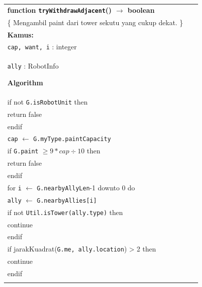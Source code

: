 \documentclass{article}
\newenvironment{pseudobox}
{
\centering
\begin{longtable}{|p{0.94\linewidth}|}
\hline
}
{
\\ \hline
\end{longtable}
\vspace{0.05cm}
}
\begin{document}
\begin{enumerate}[label=\alph*.]
\begin{enumerate}[label=\alph*.]
\begin{pseudobox}
\textbf{function \texttt{tryWithdrawAdjacent}() $\rightarrow$ boolean} \\
\{ Mengambil paint dari tower sekutu yang cukup dekat. \} \\

\textbf{Kamus:} \\
\hspace*{1.5em}\texttt{cap, want, i} : integer \\
\hspace*{1.5em}\texttt{ally} : RobotInfo

\textbf{Algorithm} \\
\hspace*{1.5em}if not \texttt{G.isRobotUnit} then \\
\hspace*{3em}return false \\
\hspace*{1.5em}endif \\

\hspace*{1.5em}\texttt{cap} $\leftarrow$ \texttt{G.myType.paintCapacity} \\
\hspace*{1.5em}if \texttt{G.paint} $\geq 9 * cap \div 10$ then \\
\hspace*{3em}return false \\
\hspace*{1.5em}endif \\

\hspace*{1.5em}for \texttt{i} $\leftarrow$ \texttt{G.nearbyAllyLen}-1 downto 0 do \\
\hspace*{3em}\texttt{ally} $\leftarrow$ \texttt{G.nearbyAllies[i]} \\

\hspace*{3em}if not \texttt{Util.isTower(ally.type)} then \\
\hspace*{4.5em}continue \\
\hspace*{3em}endif \\

\hspace*{3em}if jarakKuadrat(\texttt{G.me, ally.location}) > 2 then \\
\hspace*{4.5em}continue \\
\hspace*{3em}endif \\


\end{pseudobox}
\end{enumerate}
\end{enumerate}
\end{document}
